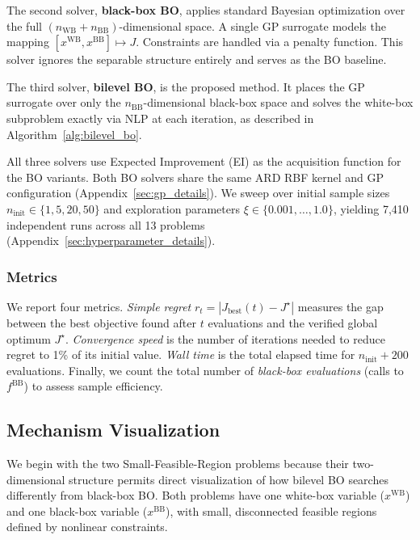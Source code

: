 \documentclass[12pt,a4paper]{article}%
\theoremstyle{plain}%
\theoremstyle{remark}%
\theoremstyle{definition}%
\def\WB{\mathrm{WB}}
\def\BB{\mathrm{BB}}
\begin{document}
The second solver, \textbf{black-box BO}, applies standard Bayesian optimization over the full $(n_{\WB}+n_{\BB})$-dimensional space. A single GP surrogate models the mapping $[x^{\WB}, x^{\BB}] \mapsto J$. Constraints are handled via a penalty function. This solver ignores the separable structure entirely and serves as the BO baseline.

The third solver, \textbf{bilevel BO}, is the proposed method. It places the GP surrogate over only the $n_{\BB}$-dimensional black-box space and solves the white-box subproblem exactly via NLP at each iteration, as described in Algorithm~\ref{alg:bilevel_bo}.

All three solvers use Expected Improvement (EI) as the acquisition function for the BO variants. Both BO solvers share the same ARD RBF kernel and GP configuration (Appendix~\ref{sec:gp_details}). We sweep over initial sample sizes $n_\text{init} \in \{1, 5, 20, 50\}$ and exploration parameters $\xi \in \{0.001, \ldots, 1.0\}$, yielding 7{,}410 independent runs across all 13 problems (Appendix~\ref{sec:hyperparameter_details}).

\subsubsection{Metrics}\label{subsec:metrics}

We report four metrics. \emph{Simple regret} $r_t = |J_\text{best}(t) - J^\star|$ measures the gap between the best objective found after $t$ evaluations and the verified global optimum $J^\star$. \emph{Convergence speed} is the number of iterations needed to reduce regret to 1\% of its initial value. \emph{Wall time} is the total elapsed time for $n_\text{init} + 200$ evaluations. Finally, we count the total number of \emph{black-box evaluations} (calls to $f^{\BB}$) to assess sample efficiency.

\subsection{Mechanism Visualization}\label{subsec:sfr_results}

We begin with the two Small-Feasible-Region problems because their two-dimensional structure permits direct visualization of how bilevel BO searches differently from black-box BO. Both problems have one white-box variable ($x^{\WB}$) and one black-box variable ($x^{\BB}$), with small, disconnected feasible regions defined by nonlinear constraints.
\end{document}
